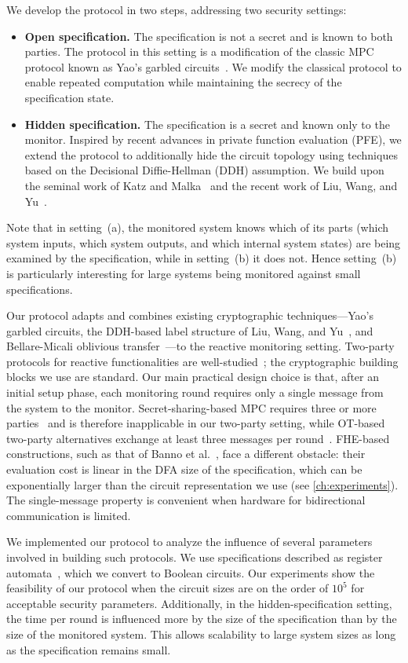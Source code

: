 We develop the protocol in two steps, addressing two security settings:
\begin{itemize}
    \item[(a)] \textbf{Open specification.} The specification is not a secret and is known to both parties. The protocol in this setting is a modification of the classic MPC protocol known as Yao's garbled circuits~\cite{Yao86,GMW87}. We modify the classical protocol to enable repeated computation while maintaining the secrecy of the specification state.
    \item[(b)] \textbf{Hidden specification.} The specification is a secret and known only to the monitor. Inspired by recent advances in private function evaluation (PFE), we extend the protocol to additionally hide the circuit topology using techniques based on the Decisional Diffie-Hellman (DDH) assumption. We build upon the seminal work of Katz and Malka~\cite{KM11} and the recent work of Liu, Wang, and Yu~\cite{LWY22}.
\end{itemize}
Note that in setting~(a), the monitored system knows which of its parts (which system inputs, which system outputs, and which internal system states) are being examined by the specification, while in setting~(b) it does not. Hence setting~(b) is particularly interesting for large systems being monitored against small specifications.

Our protocol adapts and combines existing cryptographic techniques---Yao's garbled circuits, the DDH-based label structure of Liu, Wang, and Yu~\cite{LWY22}, and Bellare-Micali oblivious transfer~\cite{BM89}---to the reactive monitoring setting.
Two-party protocols for reactive functionalities are well-studied~\cite{HL10}; the cryptographic building blocks we use are standard.
Our main practical design choice is that, after an initial setup phase, each monitoring round requires only a single message from the system to the monitor.
Secret-sharing-based MPC requires three or more parties~\cite{GMW87} and is therefore inapplicable in our two-party setting, while OT-based two-party alternatives exchange at least three messages per round~\cite{CSW20}.
FHE-based constructions, such as that of Banno et al.~\cite{BMMBWS22}, face a different obstacle: their evaluation cost is linear in the DFA size of the specification, which can be exponentially larger than the circuit representation we use (see \cref{ch:experiments}).
The single-message property is convenient when hardware for bidirectional communication is limited.

We implemented our protocol to analyze the influence of several parameters involved in building such protocols.
We use specifications described as register automata~\cite{GDPT13}, which we convert to Boolean circuits.
Our experiments show the feasibility of our protocol when the circuit sizes are on the order of $10^5$ for acceptable security parameters.
Additionally, in the hidden-specification setting, the time per round is influenced more by the size of the specification than by the size of the monitored system.
This allows scalability to large system sizes as long as the specification remains small.

